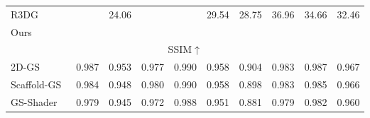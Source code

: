 \begin{table*}
{\begin{tabular}{lccccccccc}
R3DG~\cite{gao2023relightable}    &  \cellcolor{yzysecond}{34.90}                    & 24.06                    &   \cellcolor{yzybest}{35.55}                 &  \cellcolor{yzysecond}{35.25}                  &   29.54                      &  28.75                   &    \cellcolor{yzythird}36.96                  &   34.66  &  32.46            \\

Ours & \cellcolor{yzybest}{35.51}                          & \cellcolor{yzybest}{26.54}            & \cellcolor{yzythird}{34.67}                         & \cellcolor{yzythird}{35.12}                        & \cellcolor{yzybest}{30.79}         & \cellcolor{yzysecond}{30.60}                       & \cellcolor{yzysecond}{37.63}                           & \cellcolor{yzybest}{36.45}  &  \cellcolor{yzybest}{33.41}                          \\ \hline 




\multicolumn{10}{c}{SSIM$\uparrow$}                                                                                                                                                                                                                                            \\ \hline
2D-GS~\cite{Huang2DGS2024}        & \cellcolor{yzybest}0.987               & \cellcolor{yzybest}0.953   & \cellcolor{yzythird}0.977                    & \cellcolor{yzythird}0.990                   & \cellcolor{yzybest}0.958              & \cellcolor{yzybest}0.904                    & \cellcolor{yzysecond}0.983                      & \cellcolor{yzybest}0.987   &  \cellcolor{yzybest}0.967                        \\

Scaffold-GS~\cite{lu2024scaffold}      & \cellcolor{yzysecond}0.984                     & \cellcolor{yzythird}0.948                     & \cellcolor{yzysecond}0.980                    & \cellcolor{yzythird}0.990                  & \cellcolor{yzybest}0.958                         & \cellcolor{yzysecond}0.898                    & \cellcolor{yzysecond}0.983                      & \cellcolor{yzythird}0.985 & \cellcolor{yzysecond}0.966                             \\

GS-Shader~\cite{jiang2024gaussianshader}    & 0.979                     & 0.945                    & 0.972                    & 0.988                   & 0.951                         & \cellcolor{yzythird}0.881                   & 0.979                      & 0.982    &  0.960                        \\


\end{tabular}}
\end{table*}
